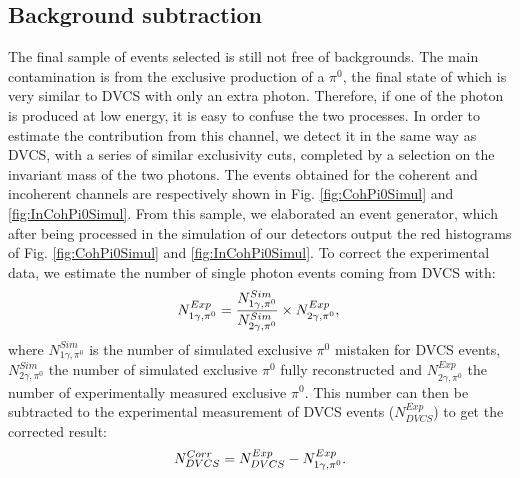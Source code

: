 \documentclass[aps,prc,preprint,superscriptaddress]{revtex4}
\begin{document}
\subsection{Background subtraction}

The final sample of events selected is still not free of backgrounds. The main contamination is 
from the exclusive production of a $\pi^0$, the final state of which is very similar to DVCS with 
only an extra photon. Therefore, if one of the photon is produced 
at low energy, it is easy to confuse the two processes. In order to estimate the contribution from
this channel, we detect it in the same way as DVCS, with a series of similar exclusivity cuts, completed
by a selection on the invariant mass of the two photons. The events obtained for the coherent and incoherent
channels are respectively shown in Fig. \ref{fig:CohPi0Simul} and \ref{fig:InCohPi0Simul}. From 
this sample, we elaborated an event generator, which after being processed
in the simulation of our detectors output the red histograms of Fig. \ref{fig:CohPi0Simul} and 
\ref{fig:InCohPi0Simul}. To correct the experimental data, we estimate the number of single photon 
events coming from DVCS with:
\begin{equation}
	N_{1\gamma,\pi^0}^{Exp} = \frac{N_{1\gamma,\pi^0}^{Sim}}{N_{2\gamma,\pi^0}^{Sim}} \times N_{2\gamma,\pi^0}^{Exp},\\
\end{equation}
where $N_{1\gamma,\pi^0}^{Sim}$ is the number of simulated exclusive $\pi^0$ mistaken for DVCS events,
$N_{2\gamma,\pi^0}^{Sim}$ the number of simulated exclusive $\pi^0$ fully reconstructed and $N_{2\gamma,\pi^0}^{Exp}$
the number of experimentally measured exclusive $\pi^0$. This number can then be subtracted to
the experimental measurement of DVCS events ($N_{DVCS}^{Exp}$) to get the corrected result: 
\begin{equation}
	N_{DVCS}^{Corr} = N_{DVCS}^{Exp} - N_{1\gamma,\pi^0}^{Exp}.\\
\end{equation}
\end{document}
